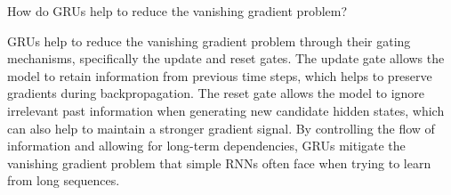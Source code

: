 \begin{ejercicio}
    How do GRUs help to reduce the vanishing gradient problem?

    GRUs help to reduce the vanishing gradient problem through their gating mechanisms, specifically the update and reset gates. The update gate allows the model to retain information from previous time steps, which helps to preserve gradients during backpropagation. The reset gate allows the model to ignore irrelevant past information when generating new candidate hidden states, which can also help to maintain a stronger gradient signal. By controlling the flow of information and allowing for long-term dependencies, GRUs mitigate the vanishing gradient problem that simple RNNs often face when trying to learn from long sequences.
\end{ejercicio}